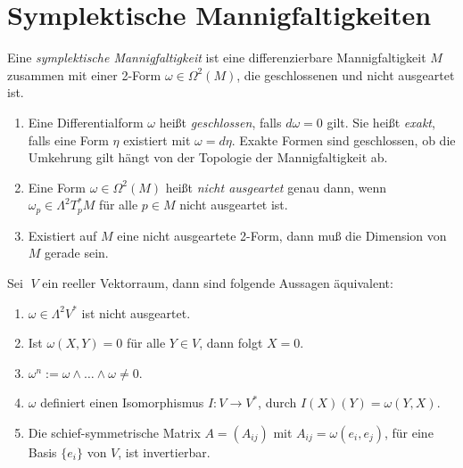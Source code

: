 \documentclass[%
	paper=a5,%
	fleqn,%
	DIV=18,%
	BCOR=0mm,
	fontsize=11pt,
	titlepage=false,%
	bibliography=totoc,
	DIV=18,%
	twoside=true,
	pdftitle=Riemannsche Geometrie,
	pdfauthor=Uwe Semmelmann,
	numbers=noendperiod]%
	{scrbook}
\begin{document}
\bigskip





\section{Symplektische Mannigfaltigkeiten}

\bigskip

\begin{Definition}
Eine \emph{ symplektische Mannigfaltigkeit} ist eine differenzierbare Mannigfaltigkeit $M$
zusammen mit einer 2-Form $\omega \in \Omega^2(M)$, die geschlossenen
und nicht ausgeartet ist.\fish
\end{Definition}

\medskip

\begin{rem*}[Bemerkungen.]
\begin{enumerate}
\item
Eine Differentialform $\omega$ hei\ss t {\itshape geschlossen}, falls $d\omega = 0$ gilt.
Sie hei\ss t {\itshape exakt}, falls eine Form $\eta $ existiert mit $\omega = d\eta$. Exakte
Formen sind geschlossen, ob die Umkehrung gilt h\"angt von der Topologie der Mannigfaltigkeit ab.
\item
Eine Form $\omega \in \Omega^2(M)$ hei\ss t {\itshape nicht ausgeartet} genau dann, wenn $\omega_p \in
\Lambda^2T_p^*M$ f\"ur alle $p \in M$ nicht ausgeartet ist.
\item
Existiert auf $M$ eine nicht ausgeartete 2-Form, dann mu\ss{} die Dimension von $M$
gerade sein.
\end{enumerate}
\end{rem*}

\bigskip

\begin{Lemma}
Sei $\; V$ ein reeller Vektorraum, dann sind folgende Aussagen \"aquivalent:
\begin{enumerate}
\item
$\omega \in \Lambda^2 V^*$ ist nicht ausgeartet.
\item
Ist $\omega (X,Y)=0$ f\"ur alle $Y\in V$, dann folgt $X=0$.
\item
$\omega^n := \omega \wedge \ldots \wedge \omega \neq 0$.
\item
$\omega$ definiert einen Isomorphismus $I: V \rightarrow V^*$, durch
$I(X)(Y) = \omega(Y,X)$.
\item
Die schief-symmetrische Matrix $A = (A_{ij})$ mit $ A_{ij} = \omega(e_i,e_j)$,
f\"ur eine Basis $\{e_i \}$ von $V$, ist invertierbar.\fish
\end{enumerate}
\end{Lemma}
\end{document}
